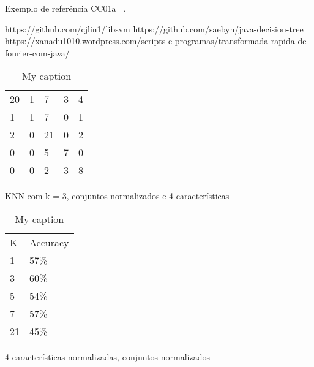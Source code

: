 \documentclass[12pt]{article}
\begin{document}
Exemplo de referência CC01a ~\cite{CC01}.

https://github.com/cjlin1/libsvm
https://github.com/saebyn/java-decision-tree
https://xanadu1010.wordpress.com/scripts-e-programas/transformada-rapida-de-fourier-com-java/

{}













\begin{table}[]
\centering
\caption{My caption}
\label{my-label}
\begin{tabular}{lllll}
20 & 1 & 7  & 3 & 4 \\
1  & 1 & 7  & 0 & 1 \\
2  & 0 & 21 & 0 & 2 \\
0  & 0 & 5  & 7 & 0 \\
0  & 0 & 2  & 3 & 8
\end{tabular}
\end{table}
KNN com k = 3, conjuntos normalizados e 4 características



\begin{table}[]
\centering
\caption{My caption}
\label{my-label}
\begin{tabular}{ll}
K  & Accuracy \\
1  & 57\%     \\
3  & 60\%     \\
5  & 54\%     \\
7  & 57\%     \\
21 & 45\%    
\end{tabular}
\end{table}
4 características normalizadas, conjuntos normalizados
\end{document}

